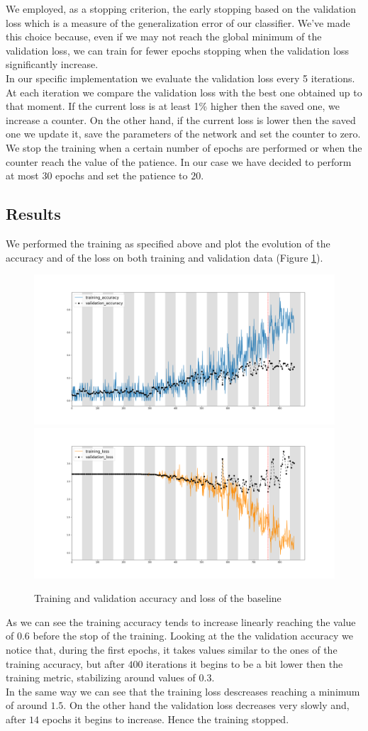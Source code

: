 \documentclass[12pt, a4paper]{report}
\begin{document}
We employed, as a stopping criterion, the early stopping based on the validation loss which is a measure of the generalization error of our classifier. We've made this choice because, even if we may not reach the global minimum of the validation loss, we can train for fewer epochs stopping when the validation loss significantly increase.\\
In our specific implementation we evaluate the validation loss every 5 iterations. At each iteration we compare the validation loss with the best one obtained up to that moment. If the current loss is at least 1\% higher then the saved one, we increase a counter. On the other hand, if the current loss is lower then the saved one we update it, save the parameters of the network and set the counter to zero. We stop the training when a certain number of epochs are performed or when the counter reach the value of the patience. In our case we have decided to perform at most $30$ epochs and set the patience to $20$.
	
\subsection*{Results}

We performed the training as specified above and plot the evolution of the accuracy and of the loss on both training and validation data (Figure \ref{fig:baseline}).

\begin{figure}[h!]
	\centering
	{\includegraphics[width=.49\textwidth]{img/baselineAcc}}
	{\includegraphics[width=.49\textwidth]{img/baselineLoss}}
	\caption{Training and validation accuracy and loss of the baseline}
	\label{fig:baseline}
\end{figure}

As we can see the training accuracy tends to increase linearly reaching the value of 0.6 before the stop of the training. Looking at the the validation accuracy we notice that, during the first epochs, it takes values similar to the ones of the training accuracy, but after $400$ iterations it begins to be a bit lower then the training metric, stabilizing around values of 0.3.\\
In the same way we can see that the training loss descreases reaching a minimum of around $1.5$. On the other hand the validation loss decreases very slowly and, after $14$ epochs it begins to increase. Hence the training stopped.
\end{document}
